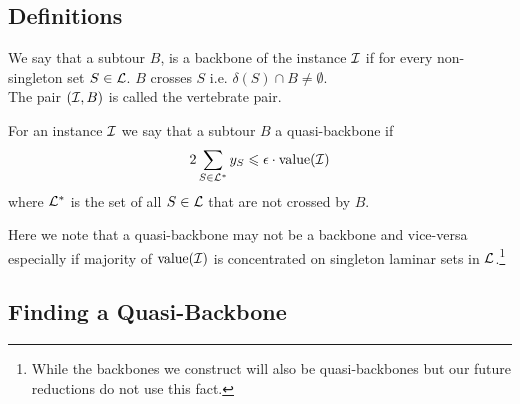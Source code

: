 \documentclass[./main.tex]{subfiles}
\begin{document}
	\subsection{Definitions}
	
	\begin{definition}
		We say that a subtour $B$, is a backbone of the instance $\mathcal{I}$ if for every non-singleton set $S \in \mathcal{L}$. $B$ crosses $S$ i.e. $\delta(S) \cap B \ne \emptyset$.\\
		The pair $(\mathcal{I}, B)$ is called the vertebrate pair.\\
	\end{definition}
	
	\begin{definition}
		For an instance $\mathcal{I}$ we say that a subtour $B$ a quasi-backbone if 
		\begin{equation}\label{def:6:q-bb}
			2\sum_{S \in \mathcal{L}^*} y_S \leqslant \epsilon\cdot\textup{value}(\mathcal{I})
		\end{equation}
		where $\mathcal{L}^*$ is the set of all $S \in \mathcal{L}$ that are not crossed by $B$.
	\end{definition}
	
	Here we note that a quasi-backbone may not be a backbone and vice-versa especially if majority of $\textup{value}(\mathcal{I})$ is concentrated on singleton laminar sets in $\mathcal{L}$.\footnote{While the backbones we construct will also be quasi-backbones but our future reductions do not use this fact.}
	
	\subsection{Finding a Quasi-Backbone}
	
\end{document}
